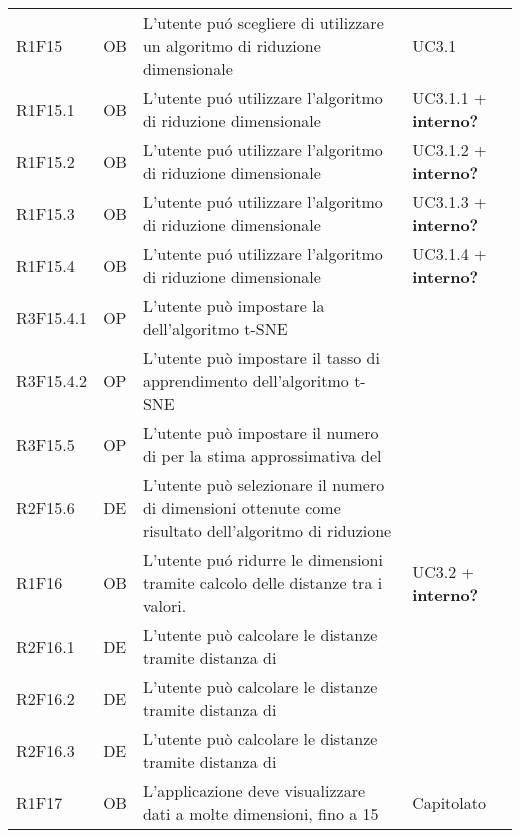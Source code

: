 {\begin{longtable}{C{2cm} | C{1.5cm} | C{9cm} | C{3.3cm}}
R1F15 & OB & L'utente puó scegliere di utilizzare un algoritmo di riduzione dimensionale & UC3.1 \\
R1F15.1 & OB & L'utente puó utilizzare l'algoritmo di riduzione dimensionale  & UC3.1.1 + \textbf{interno?} \\
R1F15.2 & OB & L'utente puó utilizzare l'algoritmo di riduzione dimensionale  & UC3.1.2 + \textbf{interno?}\\
R1F15.3 & OB & L'utente puó utilizzare l'algoritmo di riduzione dimensionale  & UC3.1.3 + \textbf{interno?}\\
R1F15.4 & OB & L'utente puó utilizzare l'algoritmo di riduzione dimensionale  & UC3.1.4 + \textbf{interno?}\\
R3F15.4.1 & OP & L'utente può impostare la  dell'algoritmo t-SNE & \\
R3F15.4.2 & OP & L'utente può impostare il tasso di apprendimento dell'algoritmo t-SNE & \\
R3F15.5 & OP & L'utente può impostare il numero di  per la stima approssimativa del  & \\
R2F15.6 & DE & L'utente può selezionare il numero di dimensioni ottenute come risultato dell'algoritmo di riduzione & \\
R1F16 & OB & L'utente puó ridurre le dimensioni tramite calcolo delle distanze tra i valori. & UC3.2 + \textbf{interno?}\\ 
R2F16.1 & DE & L'utente può calcolare le distanze tramite distanza di  &  \\
R2F16.2 & DE & L'utente può calcolare le distanze tramite distanza di  &  \\
R2F16.3 & DE & L'utente può calcolare le distanze tramite distanza di  &  \\
R1F17 & OB & L'applicazione deve visualizzare dati a molte dimensioni, fino a 15 & Capitolato\\


\end{longtable}
}







